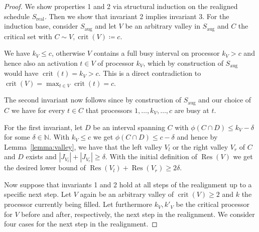 \documentclass[a4paper]{article}
\DeclareMathOperator{\aug}{aug}
\DeclareMathOperator{\real}{real}
\DeclareMathOperator{\crit}{crit}
\DeclareMathOperator{\fillop}{fill}
\DeclareMathOperator{\res}{Res}
\begin{document}
\begin{proof}
  We show properties 1 and 2 via structural induction on the realigned schedule $S_{\real}$.
  Then we show that invariant 2 implies invariant 3.
  For the induction base, consider $S_{\aug}$ and let $V$ be an arbitrary valley in $S_{\aug}$ and $C$ the critical set with $C \sim V, \crit(V) \coloneqq c$.

  We have $k_V \leq c$, otherwise $V$ contains a full busy interval on processor $k_V > c$ and hence also an activation $t \in V$ of processor $k_V$, which by construction of $S_{\aug}$ would have $\crit(t) = k_V > c$. This is a direct contradiction to $\crit(V) = \max_{t \in V} \crit(t) = c$.

  The second invariant now follows since by construction of $S_{\aug}$ and our choice of $C$ we have for every $t \in C$ that processors $1, \ldots, k_V, \ldots, c$ are busy at $t$.

  For the first invariant, let $D$ be an interval spanning $C$ with $\phi(C \cap D) \leq k_V - \delta$ for some $\delta \in \mathbb{N}$.
  With $k_V \leq c$ we get $\phi(C \cap D) \leq c - \delta$ and hence by Lemma~\ref{lemma:valley}, we have that the left valley $V_l$ or the right valley $V_r$ of $C$ and $D$ exists and $|J_{V_l}| + |J_{V_r}| \geq \delta$.
  With the initial definition of $\res(V)$ we get the desired lower bound of $\res(V_l) + \res(V_r) \geq 2 \delta$.

  Now suppose that invariants 1 and 2 hold at all steps of the realignment up to a specific next step.
  Let $V$ again be an arbitrary valley of $\crit(V) \geq 2$ and $k$ the processor currently being filled.
  Let furthermore $k_V, k'_V$ be the critical processor for $V$ before and after, respectively, the next step in the realignment.
  We consider four cases for the next step in the realignment.


\end{proof}
\end{document}
